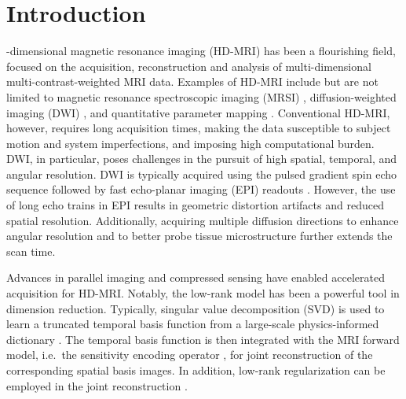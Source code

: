 \documentclass[journal,twoside,web]{ieeecolor}
\begin{document}
	\section{Introduction}
	\label{SEC:INTRO}
	-dimensional magnetic resonance imaging (HD-MRI)
	has been a flourishing field,
	focused on the acquisition, reconstruction and analysis of
	multi-dimensional multi-contrast-weighted MRI data.
	Examples of HD-MRI include but are not limited to
	magnetic resonance spectroscopic imaging (MRSI)
	\cite{brown_1982_mrsi},
	diffusion-weighted imaging (DWI)
	\cite{lebihan_1986_diff,merboldt_1985_diff},
	and quantitative parameter mapping
	\cite{doneva_2010_moba,ma_2013_mrf}.
	Conventional HD-MRI, however, requires long acquisition times,
	making the data susceptible to subject motion
	and system imperfections, and imposing high computational burden.
	DWI, in particular, poses challenges in the pursuit of
	high spatial, temporal, and angular resolution.
	DWI is typically acquired using
	the pulsed gradient spin echo sequence \cite{stejskal_1965_pgse}
	followed by fast echo-planar imaging (EPI) readouts
	\cite{mansfield_1977_epi}.
	However, the use of long echo trains in EPI results in
	geometric distortion artifacts and reduced spatial resolution.
	Additionally, acquiring multiple diffusion directions
	to enhance angular resolution and
	to better probe tissue microstructure further extends the scan time.

	Advances in parallel imaging
	\cite{roemer_1990_pi,sodickson_1997_smash,
	pruessmann_1999_sense,pruessmann_2001_gsense,griswold_2002_grappa}
	and compressed sensing
	\cite{lustig_2007_cs,block_2007_cs,liang_2007_psf}
	have enabled accelerated acquisition for HD-MRI.
	Notably, the low-rank model \cite{cai_2010_svt}
	has been a powerful tool in dimension reduction.
	Typically, singular value decomposition (SVD) is used to
	learn a truncated temporal basis function from
	a large-scale physics-informed dictionary
	\cite{huang_2012_t2basis,lam_2014_spice,mcgivney_2014_svdmrf}.
	The temporal basis function is then integrated
	with the MRI forward model,
	i.e.~the sensitivity encoding operator \cite{pruessmann_2001_gsense},
	for joint reconstruction of the corresponding spatial basis images.
	In addition, low-rank regularization can be employed
	in the joint reconstruction \cite{tamir_2017_t2shuffling}.
\end{document}
